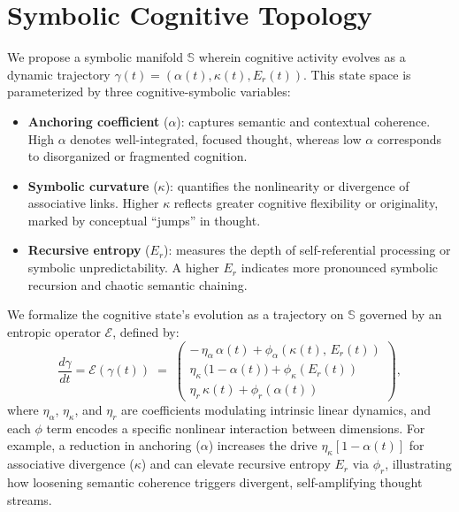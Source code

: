 \section*{Symbolic Cognitive Topology}

We propose a symbolic manifold $\mathbb{S}$ wherein cognitive activity evolves as a dynamic trajectory $\gamma(t) = (\alpha(t), \kappa(t), E_r(t))$. This state space is parameterized by three cognitive-symbolic variables:
\begin{itemize}
    \item \textbf{Anchoring coefficient} ($\alpha$): captures semantic and contextual coherence. High $\alpha$ denotes well-integrated, focused thought, whereas low $\alpha$ corresponds to disorganized or fragmented cognition.
    \item \textbf{Symbolic curvature} ($\kappa$): quantifies the nonlinearity or divergence of associative links. Higher $\kappa$ reflects greater cognitive flexibility or originality, marked by conceptual ``jumps'' in thought.
    \item \textbf{Recursive entropy} ($E_r$): measures the depth of self-referential processing or symbolic unpredictability. A higher $E_r$ indicates more pronounced symbolic recursion and chaotic semantic chaining.
\end{itemize}

We formalize the cognitive state’s evolution as a trajectory on $\mathbb{S}$ governed by an entropic operator $\mathcal{E}$, defined by:
\[
\frac{d\gamma}{dt} = \mathcal{E}(\gamma(t)) \;=\; 
\begin{pmatrix}
    -\,\eta_\alpha\,\alpha(t) + \phi_\alpha(\kappa(t),\,E_r(t))\\
    \eta_\kappa\,\big(1 - \alpha(t)\big) + \phi_\kappa(E_r(t))\\
    \eta_r\,\kappa(t) + \phi_r(\alpha(t))
\end{pmatrix}\!,
\]
where $\eta_\alpha$, $\eta_\kappa$, and $\eta_r$ are coefficients modulating intrinsic linear dynamics, and each $\phi$ term encodes a specific nonlinear interaction between dimensions. For example, a reduction in anchoring ($\alpha$) increases the drive $\eta_\kappa[1-\alpha(t)]$ for associative divergence ($\kappa$) and can elevate recursive entropy $E_r$ via $\phi_r$, illustrating how loosening semantic coherence triggers divergent, self-amplifying thought streams.

